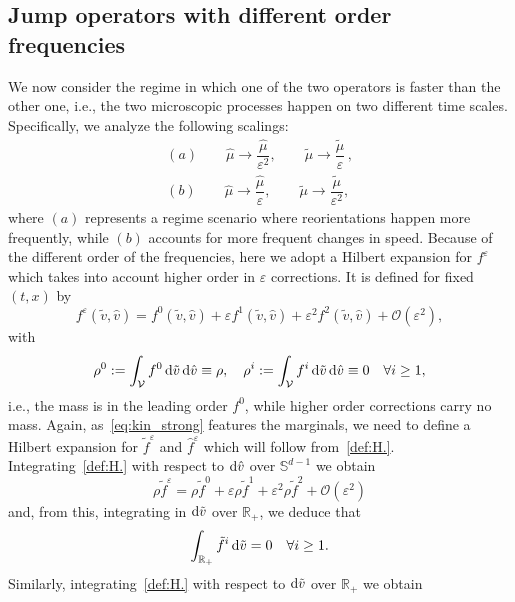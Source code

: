 \documentclass[a4paper]{article}
\theoremstyle{Theorem}\newtheorem{proposition}{Proposition}[section]
\theoremstyle{Remark}\newtheorem{remark}{Remark}[section]
\theoremstyle{Theorem}\newtheorem{theorem}{Theorem}[section]
\newcommand{\R}{\mathbb{R}}
\newcommand{\hv}{\hat{v}}
\newcommand{\tv}{\tilde{v}}
\newcommand{\hf}{\hat{f}}
\newcommand{\tf}{\tilde{f}}
\newcommand{\hmu}{\hat{\mu}}
\newcommand{\tmu}{\tilde{\mu}}
\newcommand{\intR}{\int_{\R_+}}
\newcommand{\intV}{\int_{\mathcal{V}}}
\begin{document}
\subsection{Jump operators with different order frequencies}
We now consider the regime in which one of the two operators is faster than the other one, i.e., the two microscopic processes happen on two different time scales. Specifically, we analyze the following scalings:
\begin{equation}\label{hyp.3}
\begin{split}
   (a)\qquad \hmu \rightarrow \dfrac{\hmu}{\varepsilon^2}, \qquad \tmu \rightarrow \dfrac{\tmu}{\varepsilon}\,,\\[0.3cm]
   (b)\qquad \hmu \rightarrow \dfrac{\hmu}{\varepsilon}, \qquad \tmu \rightarrow \dfrac{\tmu}{\varepsilon^2},
   \end{split}
\end{equation}
where $(a)$ represents a regime scenario where reorientations happen more frequently, while $(b)$ accounts for more frequent changes in speed. Because of the different order of the frequencies, here we adopt a Hilbert expansion for $f^\varepsilon$ which takes into account higher order in $\varepsilon$ corrections. It is defined for fixed $(t,x)$ by
\begin{equation}\label{def:H.}
    f^\varepsilon(\tv,\hv)= f^0(\tv,\hv)+\varepsilon f^1(\tv,\hv) +\varepsilon^2 f^2(\tv,\hv)+\mathcal{O}(\varepsilon^2),
\end{equation}
with
\begin{equation*}
    \rho^0 := \intV f^0 \, {\rm d} \tv \, {\rm d} \hv \equiv \rho, \quad \rho^i := \intV f^i \, {\rm d} \tv \, {\rm d} \hv \equiv 0 \quad \forall i \ge 1,
\end{equation*}
i.e., the mass is in the leading order $f^0$, while higher order corrections carry no mass.
Again, as~\eqref{eq:kin_strong} features the marginals, we need to define a Hilbert expansion for $\tf^\varepsilon$ and $\hf^\varepsilon$ which will follow from~\eqref{def:H.}. Integrating~\eqref{def:H.} with respect to ${\rm d} \hv$ over $\mathbb{S}^{d-1}$ we obtain
\begin{equation*}
    \rho \tf^\varepsilon = \rho \tf^0+\varepsilon \rho \tf^1 +\varepsilon^2 \rho \tf^2 +\mathcal{O}(\varepsilon^2)
\end{equation*}
and, from this, integrating in ${\rm d} \tv$ over $\R_+$, we deduce that 
\[
\intR \tf^i \, {\rm d} \tv =0 \quad \forall i \ge 1.
\]
Similarly, integrating~\eqref{def:H.} with respect to ${\rm d} \tv$ over $\R_+$ we obtain
\end{document}

